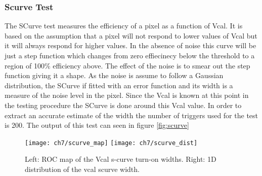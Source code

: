 \subsubsection{Scurve Test}
The SCurve test measures the efficiency of a pixel as a function of Vcal. It is based on the assumption that a pixel will not respond to lower values of Vcal but it will always respond for higher values. In the absence of noise this curve will be just a step function which changes from zero effiecinecy below the threshold to a region of 100\% efficiency above. The effect of the noise is to smear out the step function giving it a  shape. As the noise is assume to follow a Gaussian distribution, the SCurve if fitted with an error function and its width is a measure of the noise level in the pixel. Since the Vcal is known at this point in the testing procedure the SCurve is done around this Vcal value. In order to extract an accurate estimate of the width the number of triggers used for the test is 200. The output of this test can seen in figure \ref{fig:scurve}

\begin{figure}[!h]
  \centering
  \texttt{[image: ch7/scurve\_map]}
  \texttt{[image: ch7/scurve\_dist]}
  \caption[Scurve test]{Left: ROC map of the Vcal s-curve turn-on widths. Right: 1D distribution of the vcal scurve width.}\label{fig:vis_insp}
\end{figure}

